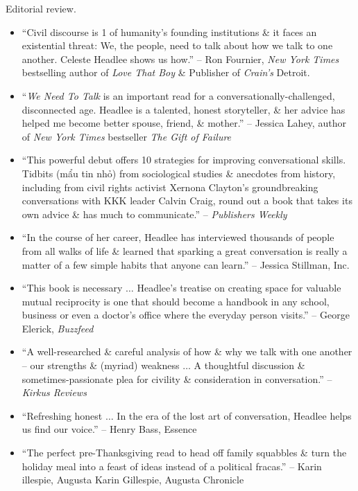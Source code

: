 \documentclass{article}
\begin{document}
\begin{enumerate}
	{\sf Editorial review.}
	\begin{itemize}
		\item ``Civil discourse is 1 of humanity's founding institutions \& it faces an existential threat: We, the people, need to talk about how we talk to one another. {\sc Celeste Headlee} shows us how.'' -- {\sc Ron Fournier}, {\it New York Times} bestselling author of {\it Love That Boy} \& Publisher of {\it Crain's} Detroit.
		\item ``{\it We Need To Talk} is an important read for a conversationally-challenged, disconnected age. {\sc Headlee} is a talented, honest storyteller, \& her advice has helped me become better spouse, friend, \& mother.'' -- {\sc Jessica Lahey}, author of {\it New York Times} bestseller {\it The Gift of Failure}
		\item ``This powerful debut offers 10 strategies for improving conversational skills. Tidbits (mẩu tin nhỏ) from sociological studies \& anecdotes from history, including from civil rights activist {\sc Xernona Clayton}'s groundbreaking conversations with KKK leader {\sc Calvin Craig}, round out a book that takes its own advice \& has much to communicate.'' -- {\it Publishers Weekly}
		\item ``In the course of her career, {\sc Headlee} has interviewed thousands of people from all walks of life \& learned that sparking a great conversation is really a matter of a few simple habits that anyone can learn.'' -- {\sc Jessica Stillman}, Inc.
		\item ``This book is necessary $\ldots$ {\sc Headlee}'s treatise on creating space for valuable mutual reciprocity is one that should become a handbook in any school, business or even a doctor's office where the everyday person visits.'' -- {\sc George Elerick}, {\it Buzzfeed}
		\item ``A well-researched \& careful analysis of how \& why we talk with one another -- our strengths \& (myriad) weakness $\ldots$ A thoughtful discussion \& sometimes-passionate plea for civility \& consideration in conversation.'' -- {\it Kirkus Reviews}
		\item ``Refreshing honest $\ldots$ In the era of the lost art of conversation, {\sc Headlee} helps us find our voice.'' -- {\sc Henry Bass}, Essence
		\item ``The perfect pre-Thanksgiving read to head off family squabbles \& turn the holiday meal into a feast of ideas instead of a political fracas.'' -- {\sc Karin illespie, Augusta Karin Gillespie, Augusta Chronicle}
	\end{itemize}
	

\end{enumerate}
\end{document}
